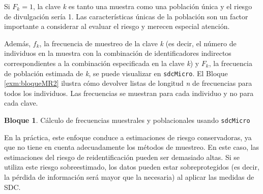 \documentclass[]{book}
\newenvironment{Shaded}{\begin{snugshade}}{\end{snugshade}}
\newcommand{\CommentTok}[1]{\textcolor[rgb]{0.56,0.35,0.01}{\textit{#1}}}
\newcommand{\DataTypeTok}[1]{\textcolor[rgb]{0.13,0.29,0.53}{#1}}
\newcommand{\KeywordTok}[1]{\textcolor[rgb]{0.13,0.29,0.53}{\textbf{#1}}}
\newcommand{\NormalTok}[1]{#1}
\newcommand{\OperatorTok}[1]{\textcolor[rgb]{0.81,0.36,0.00}{\textbf{#1}}}
\newcommand{\StringTok}[1]{\textcolor[rgb]{0.31,0.60,0.02}{#1}}
\theoremstyle{definition}
\theoremstyle{definition}
\newtheorem{example}{Bloque}[chapter]
\theoremstyle{definition}
\theoremstyle{definition}
\theoremstyle{remark}
\begin{document}
Si \(F_{k}=1\), la clave \emph{k} es tanto una muestra como una población única y el riesgo de divulgación sería 1. Las características únicas de la población son un factor importante a considerar al evaluar el riesgo y merecen especial atención.

Además, \(f_{k}\), la frecuencia de muestreo de la clave \emph{k} (es decir, el número de individuos en la muestra con la combinación de identificadores indirectos correspondientes a la combinación especificada en la clave \emph{k}) y \(F_{k}\), la frecuencia de población estimada de \emph{k}, se puede visualizar en \texttt{sdcMicro}. El Bloque \ref{exm:bloqueMR2} ilustra cómo devolver listas de longitud \emph{n} de frecuencias para todos los individuos. Las frecuencias se muestran para cada individuo y no para cada clave.

\begin{example}
\protect\hypertarget{exm:bloqueMR2}{}{\label{exm:bloqueMR2} }Cálculo de frecuencias muestrales y poblacionales usando \texttt{sdcMicro}
\end{example}

\begin{Shaded}
\end{Shaded}

En la práctica, este enfoque conduce a estimaciones de riesgo conservadoras, ya que no tiene en cuenta adecuadamente los métodos de muestreo. En este caso, las estimaciones del riesgo de reidentificación pueden ser demasiado altas. Si se utiliza este riesgo sobreestimado, los datos pueden estar sobreprotegidos (es decir, la pérdida de información será mayor que la necesaria) al aplicar las medidas de SDC.
\end{document}
